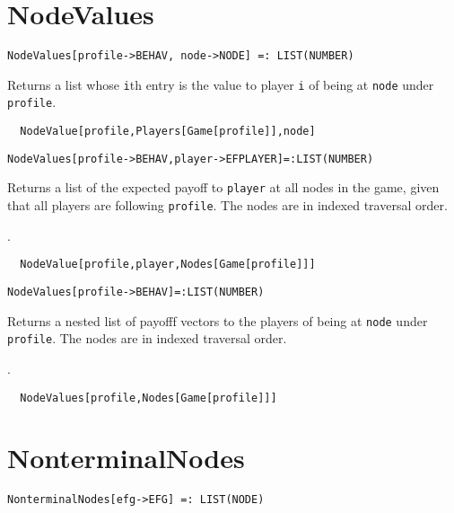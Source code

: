 
\section*{NodeValues}\label{ExtNodeValues}
\begin{verbatim}
NodeValues[profile->BEHAV, node->NODE] =: LIST(NUMBER) 
\end{verbatim}

\noindent
Returns a list whose \verb+i+th entry is the value to player \verb+i+
of being at \verb+node+ under \verb+profile+.

\udfbody
\begin{verbatim}
  NodeValue[profile,Players[Game[profile]],node]
\end{verbatim} 

\newsignature

\begin{verbatim}
NodeValues[profile->BEHAV,player->EFPLAYER]=:LIST(NUMBER)
\end{verbatim}

\noindent
Returns a list of the expected payoff to \verb+player+ at
all nodes in the game, given that all players are following
\verb+profile+.  The nodes are in indexed traversal order.

\seealso {}.

\udfbody
\begin{verbatim}
  NodeValue[profile,player,Nodes[Game[profile]]]
\end{verbatim}

\newsignature

\begin{verbatim}
NodeValues[profile->BEHAV]=:LIST(NUMBER)
\end{verbatim}

\noindent
Returns a nested list of payofff vectors to the players of being
at \verb+node+ under \verb+profile+.  The nodes are in indexed traversal
order.

\seealso {}.

\udfbody
\begin{verbatim}
  NodeValues[profile,Nodes[Game[profile]]]
\end{verbatim}


\section*{NonterminalNodes}\label{ExtNonterminalNodes}
\begin{verbatim}
NonterminalNodes[efg->EFG] =: LIST(NODE) 
\end{verbatim}

